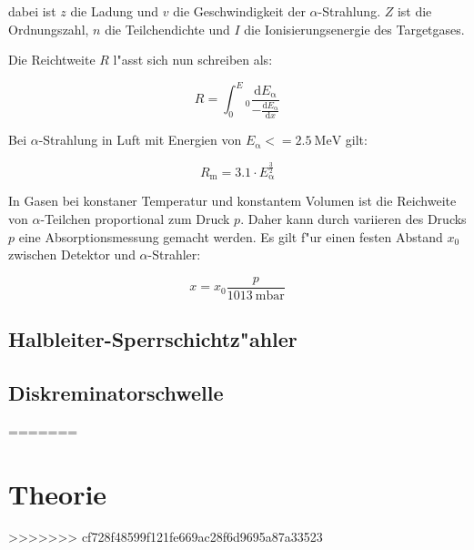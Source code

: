 dabei ist $z$ die Ladung und $v$ die Geschwindigkeit der $\alpha$-Strahlung. $Z$ ist die Ordnungszahl, $n$ die Teilchendichte und $I$ die Ionisierungsenergie des Targetgases.

Die Reichtweite $R$ l"asst sich nun schreiben als:

\begin{equation}
	R = \int_0^E_\mathrm{0} \frac{\mathrm{d}E_\mathrm{\alpha}}{- \frac{\mathrm{d}E_\mathrm{\alpha}}{\mathrm{d}x}}
\end{equation}

Bei $\alpha$-Strahlung in Luft mit Energien von $E_\mathrm{\alpha} <= \SI{2.5}{\mega\electronvolt}$ gilt:

\begin{equation}
	R_\mathrm{m} = 3.1 \cdot E_\mathrm{\alpha}^\frac{3}{2}
\end{equation}

In Gasen bei konstaner Temperatur und konstantem Volumen ist die Reichweite von $\alpha$-Teilchen proportional zum Druck $p$. Daher kann durch variieren des Drucks $p$ eine Absorptionsmessung gemacht werden. Es gilt f"ur einen festen Abstand $x_\mathrm{0}$ zwischen Detektor und $\alpha$-Strahler:

\begin{equation}
	x = x_\mathrm{0} \frac{p}{\SI{1013}{\milli\bar}}
\end{equation}

\subsection{Halbleiter-Sperrschichtz"ahler} %
\label{sub:halbleiter_sperrschichtz_ahler}


\subsection{Diskreminatorschwelle} %
\label{sub:diskreminatorschwelle}
=======

	
\section{Theorie} %
\label{sec:theorie}

>>>>>>> cf728f48599f121fe669ac28f6d9695a87a33523
